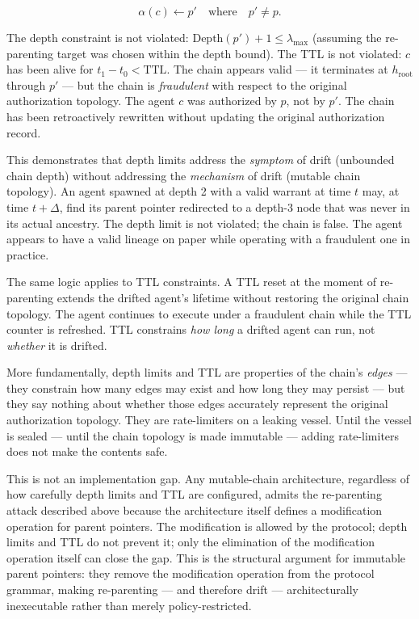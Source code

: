 \[
\alpha(c) \leftarrow p' \quad \text{where} \quad p' \neq p.
\]

The depth constraint is not violated: $\text{Depth}(p') + 1 \leq \lambda_{\text{max}}$ (assuming the re-parenting target was chosen within the depth bound). The TTL is not violated: $c$ has been alive for $t_1 - t_0 < \text{TTL}$. The chain appears valid — it terminates at $h_{\text{root}}$ through $p'$ — but the chain is \emph{fraudulent} with respect to the original authorization topology. The agent $c$ was authorized by $p$, not by $p'$. The chain has been retroactively rewritten without updating the original authorization record.

This demonstrates that depth limits address the \emph{symptom} of drift (unbounded chain depth) without addressing the \emph{mechanism} of drift (mutable chain topology). An agent spawned at depth 2 with a valid warrant at time $t$ may, at time $t + \Delta$, find its parent pointer redirected to a depth-3 node that was never in its actual ancestry. The depth limit is not violated; the chain is false. The agent appears to have a valid lineage on paper while operating with a fraudulent one in practice.

The same logic applies to TTL constraints. A TTL reset at the moment of re-parenting extends the drifted agent's lifetime without restoring the original chain topology. The agent continues to execute under a fraudulent chain while the TTL counter is refreshed. TTL constrains \emph{how long} a drifted agent can run, not \emph{whether} it is drifted.

More fundamentally, depth limits and TTL are properties of the chain's \emph{edges} — they constrain how many edges may exist and how long they may persist — but they say nothing about whether those edges accurately represent the original authorization topology. They are rate-limiters on a leaking vessel. Until the vessel is sealed — until the chain topology is made immutable — adding rate-limiters does not make the contents safe.

This is not an implementation gap. Any mutable-chain architecture, regardless of how carefully depth limits and TTL are configured, admits the re-parenting attack described above because the architecture itself defines a modification operation for parent pointers. The modification is allowed by the protocol; depth limits and TTL do not prevent it; only the elimination of the modification operation itself can close the gap. This is the structural argument for immutable parent pointers: they remove the modification operation from the protocol grammar, making re-parenting — and therefore drift — architecturally inexecutable rather than merely policy-restricted.

